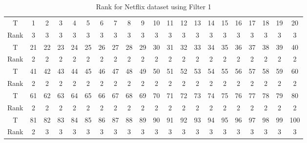 \documentclass[12pt]{article}
\begin{document}
\begin{table}[!ht]
    \centering
    \caption{Rank for Netflix dataset using Filter 1}
    \label{table:netflix_filter1}
    \begin{tabular}{c|c|c|c|c|c|c|c|c|c|c|c|c|c|c|c|c|c|c|c|c}
    \hline
     T & 1&2 &3 &4 &5 & 6 & 7& 8 & 9 & 10&  11  & 12&   13&   14&   15&   16&   17 &  18 &  19  & 20\\
     Rank & 3& 3 &3 &3 &3 &3 &3& 3& 3 &3 &3& 3 &3& 3& 3& 3& 3 &3& 3& 3 \\
     \hline
    T & 21 &  22  & 23&   24 &  25 &  26 &  27 &  28  & 29 &  30  & 31 &  32 &  33  & 34 &  35&   36&   37 & 38  & 39 &  40 \\
     Rank  & 2& 2&2 &2 &2 &2 &2& 2& 2 &2 &2& 2 &2& 2& 2& 2&2 &2& 2& 2  \\
     \hline
    T &41  & 42&   43 &  44 &  45  & 46  & 47  & 48 &  49 &  50 &  51  & 52& 
 53 &  54  & 55  & 56 &  57 &  58 &  59 &  60  \\
 Rank& 2& 2&2 &2 &2 &2 &2& 2& 2 &2 &2& 2 &2& 2& 2& 2&2 &2& 2& 2  \\
  \hline
T & 61 &  62  & 63 &  64 &  65 &  66 &  67 &  68  & 69&   70  & 71  & 72 &  73 &  74 &  75 &  76  & 77 &  78 &  79  & 80 \\
  Rank& 2& 2&2 &2 &2 &2 &2& 2& 2 &2 &2& 2 &2& 2& 2& 2&2 &2& 2& 2 \\
 \hline
T &  81 &  82&   83 &  84  & 85 &  86 &  87  & 88 &  89 &  90 &  91 &  92 &  93&   94 &  95 &  96&   97 &  98 &  99 & 100\\
  Rank & 2& 3 &3 &3 &3 &3 &3& 3& 3 &3 &3& 3 &3& 3& 3& 3& 3 &3& 3& 3\\
   \hline
    \end{tabular}
\end{table}
\end{document}
